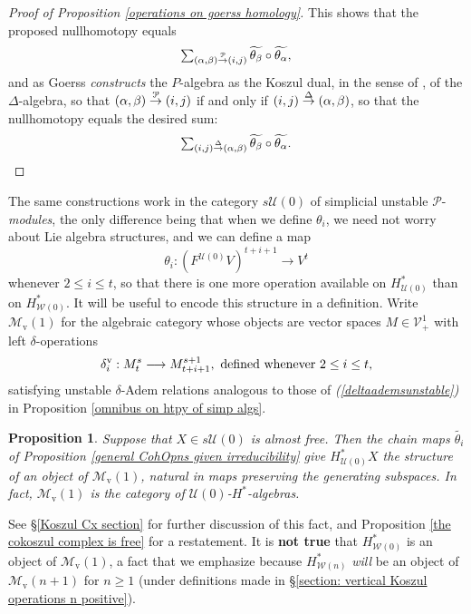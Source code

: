 \documentclass[11pt]{amsart} \renewcommand{\baselinestretch}{1.2}
\theoremstyle{plain}
\newtheorem{prop}[thm]{Proposition}
\numberwithin{equation}{section} %
\theoremstyle{plain}
\newtheorem{prop}[thm]{Proposition}
\numberwithin{equation}{chapter} %
\renewcommand{\to}{\longrightarrow}
\newcommand{\calU}{\mathcal{U}}
\newcommand{\calP}{\mathcal{P}}
\newcommand{\calV}{\mathcal{V}}
\newcommand{\calw}{\mathcal{W}}
\newcommand{\calMv}{\mathcal{M}\dver}
\newcommand{\Palg}{{\calP}}
\newcommand{\vect}[2]{\calV^{#1}_{#2}}
\newcommand{\produces}[3]{#3:#1\sim #2}
\renewcommand{\produces}[3]{#1\rightarrow_{#3} #2}%
\renewcommand{\produces}[3]{#1\overset{\smash{#3}}{\rightarrow} #2}%
\newcommand{\uver}{^\mathrm{v}}
\newcommand{\dver}{_\mathrm{v}}
\newcommand{\deltav}{\delta\uver}
\begin{document}
\begin{Cohomology Operations for W and U}
\begin{proof}[Proof of Proposition \ref{operations on goerss homology}]
This shows that the proposed nullhomotopy equals  
\[\textstyle\sum_{\produces{(\alpha,\beta)}{(i,j)}{\Palg}}\widetilde{\theta_\beta}\circ\widetilde{\theta_\alpha},\]
 and as Goerss \cite{MR1089001} \emph{constructs} the $P$-algebra as the Koszul dual, in the sense of \cite{PriddyKoszul.pdf}, of the $\Delta$-algebra, so that $\produces{(\alpha,\beta)}{(i,j)}{\Palg}$ if and only if $\produces{(i,j)}{(\alpha,\beta)}{\Delta}$, so that the nullhomotopy equals the desired sum:
\[\textstyle\sum_{\produces{(i,j)}{(\alpha,\beta)}{\Delta}}\widetilde{\theta_\beta}\circ\widetilde{\theta_\alpha}.\qedhere\]
\end{proof}
The same constructions work in the category $s\calU(0)$ of simplicial unstable $\Palg$-\emph{modules}, the only difference being that when we define $\theta_i$, we need not worry about Lie algebra structures, and we can define a map
\[\theta_i:(F^{\calU(0)}V)^{t+i+1}\to V^t\]
whenever $2\leq i\leq t$, so that there is one more operation available on $H^*_{\calU(0)}$ than on $H^*_{\calw(0)}$. It will be useful to encode this structure in a definition. Write $\calMv(1)$ for the algebraic category whose objects are vector spaces $M\in\vect{1}{+}$ with left $\delta$-operations
\[\deltav_i:M^{s}_t\to M^{s+1}_{t+i+1},\textup{ defined whenever $2\leq i\leq t$,}\]
satisfying unstable $\delta$-Adem relations analogous to those of \emph{(\ref{deltaademsunstable})} in Proposition \ref{omnibus on htpy of simp algs}.
\begin{prop}
\label{operations on untable P homology}
Suppose that $X\in s\calU(0)$ is almost free. Then the chain maps $\widetilde{\theta_i}$ of Proposition \ref{general CohOpns given irreducibility} give $H^*_{\calU(0)}X$ the structure of an object of $\calMv(1)$, natural in maps preserving the generating subspaces. In fact, $\calMv(1)$ is the category of $\calU(0)$-$H^*$-algebras.
\end{prop}
\noindent See \S\ref{Koszul Cx section} for further discussion of this fact, and Proposition \ref{the cokoszul complex is free} for a restatement. It is \textbf{not true} that $H^*_{\calw(0)}$ is an object of $\calMv(1)$, a fact that we emphasize because $H^*_{\calw(n)}$ \emph{will} be an object of $\calMv(n+1)$ for $n\geq 1$ (under definitions made in \S\ref{section: vertical Koszul operations n positive}).


\end{Cohomology Operations for W and U}
\end{document}
